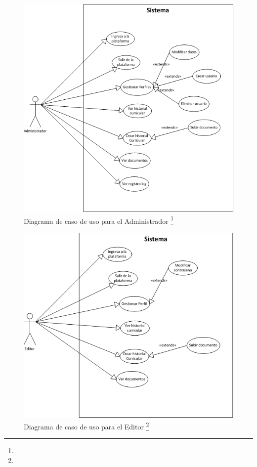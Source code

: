	
	\begin{figure}[H]
		\centering
		\includegraphics[width=1\textwidth]{images/Capitulo_3/caso_uso_Administrador.png}
		\caption[Diagrama de caso de uso para el Administrador]{Diagrama de caso de uso para el Administrador \footnote{}}
		\label{caso_uso_Administrador}
	\end{figure}
	
	\begin{figure}[H]
		\centering
		\includegraphics[width=1\textwidth]{images/Capitulo_3/caso_uso_Editor.png}
		\caption[Diagrama de caso de uso para el Editor]{Diagrama de caso de uso para el Editor \footnote{}}
		\label{caso_uso_Editor}
	\end{figure}
	

